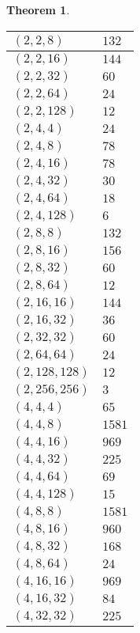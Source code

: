 \documentclass{dcthesis}
\numberwithin{equation}{section}
\newtheorem{theorem}[equation]{Theorem}
\theoremstyle{definition}
\theoremstyle{remark}
\begin{document}
{{\begin{theorem}
\begin{longtable}{|l|l|}
        $(2,2,8)$ & $132$ \\ \hline
        $(2,2,16)$ & $144$ \\ \hline
        $(2,2,32)$ & $60$ \\ \hline
        $(2,2,64)$ & $24$ \\ \hline
        $(2,2,128)$ & $12$ \\ \hline
        $(2,4,4)$ & $24$ \\ \hline
        $(2,4,8)$ & $78$ \\ \hline
        $(2,4,16)$ & $78$ \\ \hline
        $(2,4,32)$ & $30$ \\ \hline
        $(2,4,64)$ & $18$ \\ \hline
        $(2,4,128)$ & $6$ \\ \hline
        $(2,8,8)$ & $132$ \\ \hline
        $(2,8,16)$ & $156$ \\ \hline
        $(2,8,32)$ & $60$ \\ \hline
        $(2,8,64)$ & $12$ \\ \hline
        $(2,16,16)$ & $144$ \\ \hline
        $(2,16,32)$ & $36$ \\ \hline
        $(2,32,32)$ & $60$ \\ \hline
        $(2,64,64)$ & $24$ \\ \hline
        $(2,128,128)$ & $12$ \\ \hline
        $(2,256,256)$ & $3$ \\ \hline
        $(4,4,4)$ & $65$ \\ \hline
        $(4,4,8)$ & $1581$ \\ \hline
        $(4,4,16)$ & $969$ \\ \hline
        $(4,4,32)$ & $225$ \\ \hline
        $(4,4,64)$ & $69$ \\ \hline
        $(4,4,128)$ & $15$ \\ \hline
        $(4,8,8)$ & $1581$ \\ \hline
        $(4,8,16)$ & $960$ \\ \hline
        $(4,8,32)$ & $168$ \\ \hline
        $(4,8,64)$ & $24$ \\ \hline
        $(4,16,16)$ & $969$ \\ \hline
        $(4,16,32)$ & $84$ \\ \hline
        $(4,32,32)$ & $225$ \\ \hline

\end{longtable}
\end{theorem}}}
\end{document}
